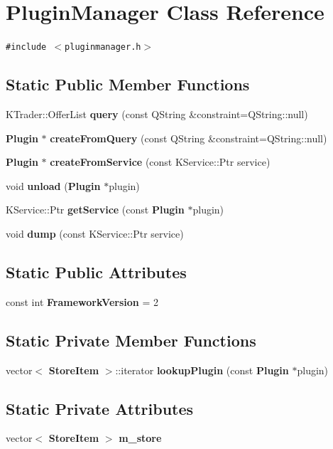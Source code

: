 \section{Plugin\-Manager Class Reference}
\label{classPluginManager}
{\tt \#include $<$pluginmanager.h$>$}

\subsection*{Static Public Member Functions}
\begin{CompactItemize}
\item 
KTrader::Offer\-List {\bf query} (const QString \&constraint=QString::null)
\item 
{\bf Plugin} $\ast$ {\bf create\-From\-Query} (const QString \&constraint=QString::null)
\item 
{\bf Plugin} $\ast$ {\bf create\-From\-Service} (const KService::Ptr service)
\item 
void {\bf unload} ({\bf Plugin} $\ast$plugin)
\item 
KService::Ptr {\bf get\-Service} (const {\bf Plugin} $\ast$plugin)
\item 
void {\bf dump} (const KService::Ptr service)
\end{CompactItemize}
\subsection*{Static Public Attributes}
\begin{CompactItemize}
\item 
const int {\bf Framework\-Version} = 2
\end{CompactItemize}
\subsection*{Static Private Member Functions}
\begin{CompactItemize}
\item 
vector$<$ {\bf Store\-Item} $>$::iterator {\bf lookup\-Plugin} (const {\bf Plugin} $\ast$plugin)
\end{CompactItemize}
\subsection*{Static Private Attributes}
\begin{CompactItemize}
\item 
vector$<$ {\bf Store\-Item} $>$ {\bf m\_\-store}
\end{CompactItemize}


